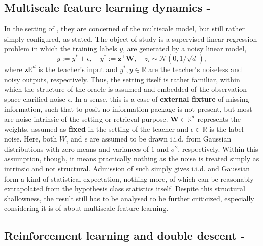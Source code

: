 \subsection{Multiscale feature learning dynamics - \cite{pezeshki2021multiscalefeaturelearningdynamics}}

In the setting of \cite{pezeshki2021multiscalefeaturelearningdynamics}, they are concerned of the multiscale model, but still rather simply configured, as stated. The object of study is a supervised linear regression problem in which the training labels $y$, are generated by a noisy linear model, 
\begin{equation}
    y := y^{*} + \epsilon, \quad y^{*}:= \bm{z}^{\top}\mathbf{W}, \quad z_{i} \sim \mathcal{N}(0,1/\sqrt{d}),
\end{equation}
where $\bm{z}\mathbb{R}^{d}$ is the teacher's input and $y^{*},y\in\mathbb{R}$ are the teacher's noiseless and noisy outputs, respectively. Thus, the setting itself is rather familiar, within which the structure of the oracle is assumed and embedded of the observation space clarified noise $\epsilon$. In a sense, this is a case of \textbf{external fixture} of missing information, such that to posit no information package is not present, but most are noise intrinsic of the setting or retrieval purpose. $\mathbf{W}\in\mathbb{R}^{d}$ represents the weights, assumed as \textbf{fixed} in the setting of the teacher and $\epsilon\in\mathbb{R}$ is the label noise. Here, both $W_{i}$ and $\epsilon$ are assumed to be drawn i.i.d. from Gaussian distributions with zero means and variances of $1$ and $\sigma^{2}$, respectively. Within this assumption, though, it means practically nothing as the noise is treated simply as intrinsic and not structural. Admission of such simply gives i.i.d. and Gaussian form a kind of statistical expectation, nothing more, of which can be reasonably extrapolated from the hypothesis class statistics itself. Despite this structural shallowness, the result still has to be analysed to be further criticized, especially considering it is of about multiscale feature learning. 


\subsection{Reinforcement learning and double descent - \cite{brellmann2024on}}

